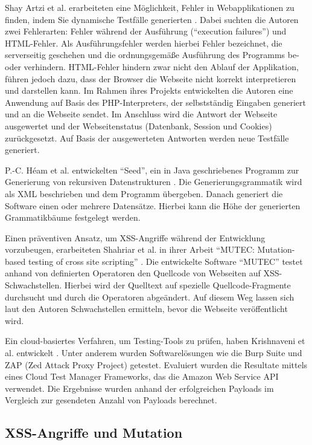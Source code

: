 Shay Artzi et al. erarbeiteten eine Möglichkeit, Fehler in Webapplikationen zu finden, indem Sie dynamische Testfälle generierten \cite{Artzi2010}. Dabei suchten die Autoren zwei Fehlerarten: Fehler während der Ausführung (``execution failures'') und HTML-Fehler. Als Ausführungsfehler werden hierbei Fehler bezeichnet, die serverseitig geschehen und die ordnungsgemäße Ausführung des Programms be- oder verhindern. HTML-Fehler hindern zwar nicht den Ablauf der Applikation, führen jedoch dazu, dass der Browser die Webseite nicht korrekt interpretieren und darstellen kann. Im Rahmen ihres Projekts entwickelten die Autoren eine Anwendung auf Basis des PHP-Interpreters, der selbstständig Eingaben generiert und an die Webseite sendet. Im Anschluss wird die Antwort der Webseite ausgewertet und der Webseitenstatus (Datenbank, Session und Cookies) zurückgesetzt. Auf Basis der ausgewerteten Antworten werden neue Testfälle generiert.

P.-C. Héam et al. entwickelten ``Seed'', ein in Java geschriebenes Programm zur Generierung von rekursiven Datenstrukturen \cite{Heam2011}. Die Generierungsgrammatik wird als XML beschrieben und dem Programm übergeben. Danach generiert die Software einen oder mehrere Datensätze. Hierbei kann die Höhe der generierten Grammatikbäume festgelegt werden.

Einen präventiven Ansatz, um \ac{XSS}-Angriffe während der Entwicklung vorzubeugen, erarbeiteten Shahriar et al. in ihrer Arbeit ``MUTEC: Mutation-based testing of cross site scripting'' \cite{Shahriar2009}. Die entwickelte Software ``MUTEC'' testet anhand von definierten Operatoren den Quellcode von Webseiten auf \ac{XSS}-Schwachstellen. Hierbei wird der Quelltext auf spezielle Quellcode-Fragmente durchsucht und durch die Operatoren abgeändert. Auf diesem Weg lassen sich laut den Autoren Schwachstellen ermitteln, bevor die Webseite veröffentlicht wird.

Ein cloud-basiertes Verfahren, um Testing-Tools zu prüfen, haben Krishnaveni et al. entwickelt \cite{Krishnaveni2017}. Unter anderem wurden Softwarelösungen wie die Burp Suite und ZAP (Zed Attack Proxy Project) getestet. Evaluiert wurden die Resultate mittels eines Cloud Test Manager Frameworks, das die Amazon Web Service API verwendet. Die Ergebnisse wurden anhand der erfolgreichen Payloads im Vergleich zur gesendeten Anzahl von Payloads berechnet.

\newpage
\subsection{\ac{XSS}-Angriffe und Mutation}\label{sec:attacksAndMutation}


